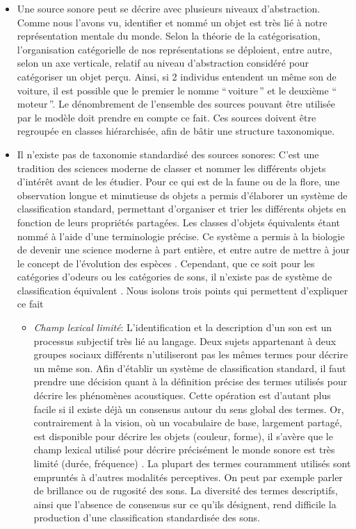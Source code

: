 \begin{itemize}
\item Une source sonore peut se décrire avec plusieurs niveaux d'abstraction. Comme nous l'avons vu, identifier et nommé un objet est très lié à notre représentation mentale du monde. Selon la théorie de la catégorisation, l'organisation catégorielle de nos représentations se déploient, entre autre, selon un axe verticale, relatif au niveau d'abstraction considéré pour catégoriser un objet perçu. Ainsi, si 2 individus entendent un même son de voiture, il est possible que le premier le nomme ``\,voiture\,'' et le deuxième ``\,moteur\,''. Le dénombrement de l'ensemble des sources pouvant être utilisée par le modèle doit prendre en compte ce fait. Ces sources doivent être regroupée en classes hiérarchisée, afin de bâtir une structure taxonomique.
\item Il n'existe pas de taxonomie standardisé des sources sonores: C'est une tradition des sciences moderne de classer et nommer les différents objets d’intérêt avant de les étudier. Pour ce qui est de la faune ou de la flore, une observation longue et minutieuse ds objets a permis d'élaborer un système de classification standard, permettant d'organiser et trier les différents objets en fonction de leurs propriétés partagées. Les classes d’objets équivalents étant nommé à l'aide d'une terminologie précise. Ce système a permis à la biologie de devenir une science moderne à part entière, et entre autre de mettre à jour le concept de l'évolution des espèces \citep{lecointre2006tree}. Cependant, que ce soit pour les catégories d'odeurs ou les catégories de sons, il n’existe pas de système de classification équivalent \citep{dubois2000categories,niessen2010categories}. Nous isolons trois points qui permettent d'expliquer ce fait
\begin{itemize}
\item \emph{Champ lexical limité}: L'identification et la description d'un son est un processus subjectif très lié au langage. Deux sujets appartenant à deux groupes sociaux différents n'utiliseront pas les mêmes termes pour décrire un même son. Afin d'établir un système de classification standard, il faut prendre une décision quant à la définition précise des termes utilisés pour décrire les phénomènes acoustiques. Cette opération est d'autant plus facile si il existe déjà un consensus autour du sens global des termes. Or, contrairement à la vision, où un vocabulaire de base, largement partagé, est disponible pour décrire les objets (couleur, forme), il s'avère que le champ lexical utilisé pour décrire précisément le monde sonore est très limité (durée, fréquence)  \citep{dubois2000categories}. La plupart des termes couramment utilisés sont  empruntés à d'autres modalités perceptives. On peut par exemple parler de brillance ou de rugosité des sons. La diversité des termes descriptifs, ainsi que l'absence de consensus sur ce qu'ils désignent, rend difficile la production d'une classification standardisée des sons.

\end{itemize}
\end{itemize}
